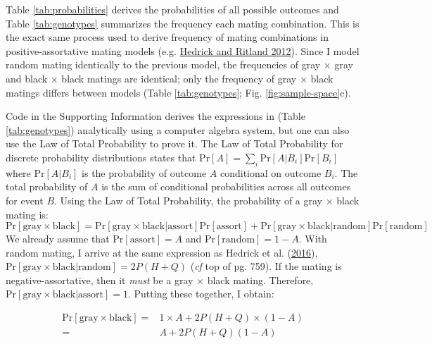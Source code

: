 \documentclass[
]{article}
\begin{document}
Table \ref{tab:probabilities} derives the probabilities of all possible outcomes and Table \ref{tab:genotypes} summarizes the frequency each mating combination. This is the exact same process used to derive frequency of mating combinations in positive-assortative mating models (e.g. \protect\hyperlink{ref-hedrick_population_2012}{Hedrick and Ritland 2012}). Since I model random mating identically to the previous model, the frequencies of gray \(\times\) gray and black \(\times\) black matings are identical; only the frequency of gray \(\times\) black matings differs between models (Table \ref{tab:genotypes}; Fig. \ref{fig:sample-space}c).

Code in the Supporting Information derives the expressions in (Table \ref{tab:genotypes}) analytically using a computer algebra system, but one can also use the Law of Total Probability to prove it. The Law of Total Probability for discrete probability distributions states that \(\mathrm{Pr}[A] = \sum_i \mathrm{Pr}[A|B_i] \mathrm{Pr}[B_i]\) where \(\mathrm{Pr}[A|B_i]\) is the probability of outcome \(A\) conditional on outcome \(B_i\). The total probability of \(A\) is the sum of conditional probabilities across all outcomes for event \(B\). Using the Law of Total Probability, the probability of a gray \(\times\) black mating is:
\[\mathrm{Pr}[\textrm{gray} \times \textrm{black}] = \mathrm{Pr}[\textrm{gray} \times \textrm{black}|\textrm{assort}] \mathrm{Pr}[\textrm{assort}] + \mathrm{Pr}[\textrm{gray} \times \textrm{black}|\textrm{random}] \mathrm{Pr}[\textrm{random}]\]
We already assume that \(\mathrm{Pr}[\textrm{assort}] = A\) and \(\mathrm{Pr}[\textrm{random}] = 1 - A\). With random mating, I arrive at the same expression as Hedrick et al. (\protect\hyperlink{ref-hedrick_negative-assortative_2016}{2016}), \(\mathrm{Pr}[\textrm{gray} \times \textrm{black}|\textrm{random}] = 2P(H+Q)\) (\emph{cf} top of pg. 759). If the mating is negative-assortative, then it \emph{must} be a gray \(\times\) black mating. Therefore, \(\mathrm{Pr}[\textrm{gray} \times \textrm{black}|\textrm{assort}] = 1\). Putting these together, I obtain:

\begin{align}
  \mathrm{Pr}[\textrm{gray} \times \textrm{black}] = & 1 \times A + 2P(H+Q) \times (1-A) \nonumber \\
  = & A + 2 P (H + Q) (1 - A) \label{eq1}
\end{align}
\end{document}
